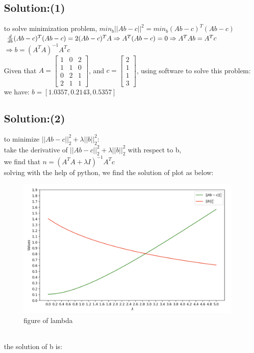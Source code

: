 \documentclass{article}
\begin{document}
{{\subsection*{Solution:(1)}
to solve minimization problem, $min_b||Ab-c||^2=min_b(Ab-c)^T(Ab-c)$\\
$\frac{d}{db}(Ab-c)^T(Ab-c)=2(Ab-c)^TA\\\Rightarrow A^T(Ab-c)=0\\\Rightarrow A^TAb=A^Tc$\\
$\Rightarrow b = (A^TA)^{-1}A^Tc$\\
Given that $ A = \begin{bmatrix}
	1&0&2\\1&1&0\\0&2&1\\2&1&1
\end{bmatrix} $, and $ c = \begin{bmatrix}2\\1\\1\\3\end{bmatrix} $,
using software to solve this problem: \\we have: $b = [1.0357, 0.2143, 0.5357]$

\subsection*{Solution:(2)}
to minimize $||Ab-c||_2^2+\lambda ||b||_2^2$:\\
take the derivative of $||Ab-c||_2^2+\lambda ||b||_2^2$ with respect to b,\\
we find that $n = (A^TA +\lambda I)^{-1}A^Tc$\\
solving with the help of python, we find the solution of plot as below:

\begin{figure}[htbp]
	\centering
	\includegraphics[scale=0.3]{img.jpg}
	\caption{figure of lambda}
	\label{figure}
\end{figure}
~\\
the solution of b is:\\

}}
\end{document}
